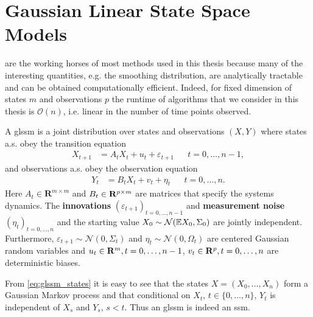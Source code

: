 \section{Gaussian Linear State Space Models}
\label{sec:linear_gaussian_state_space_models}

 are the working horses of most methods used in this thesis because many of the interesting quantities, e.g. the smoothing distribution, are analytically tractable and can be obtained computationally efficient. Indeed, for fixed dimension of states $m$ and observations $p$ the runtime of algorithms that we consider in this thesis is $\mathcal O(n)$, i.e. linear in the number of time points observed. 

\begin{definition}
    \label{def:glssm}
    A \acrfull{glssm} is a joint distribution over states and observations $(X,Y)$ where states a.s. obey the transition equation
    \begin{align}
        \label{eq:glssm_states}
        X_{t + 1} & = A_{t}X_{t} + u_{t} + \varepsilon_{t + 1} &  & t = 0, \dots, n - 1,
    \end{align}
    and observations a.s. obey the observation equation
    \begin{align}
        \label{eq:glssm_observations}
        Y_{t} & = B_{t}X_{t} + v_{t} + \eta_{t} &  & t = 0, \dots, n.
    \end{align}
    Here $A_{t} \in \mathbf{R}^{m \times m}$ and $B_{t} \in \mathbf R^{p\times m}$ are matrices that specify the systems dynamics. The \textbf{innovations} $(\varepsilon_{t + 1})_{t = 0, \dots, n-1}$ and \textbf{measurement noise} $(\eta_{t})_{t = 0, \dots, n}$ and the  starting value $X_{0} \sim \mathcal N (\mathbb E X_{0}, \Sigma_{0})$ are jointly independent. Furthermore, $\varepsilon_{t+1} \sim \mathcal N(0, \Sigma_{t})$ and $\eta_{t}\sim \mathcal N(0, \Omega_{t})$ are centered Gaussian random variables and $u_{t} \in \mathbf R^{m}, t = 0, \dots, n - 1$, $v_{t} \in \mathbf R^{p}, t = 0, \dots, n$ are deterministic biases.
\end{definition}

\begin{remark}
    From \eqref{eq:glssm_states} it is easy to see that the states $X = (X_{0}, \dots, X_{n})$ form a Gaussian Markov process and that conditional on $X_{t}$, $t \in \{0, \dots, n\}$, $Y_{t}$ is independent of $X_{s}$ and $Y_{s}$, $s < t$. Thus an \gls{glssm} is indeed an \gls{ssm}.
\end{remark}


